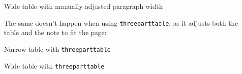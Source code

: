 \documentclass[11pt,a4paper]{article}
\begin{document}
\begin{table}[H]
	\caption{Wide table with manually adjusted paragraph width}
	\label{tbl_widenote}
	\begin{adjustbox}{max width = \textwidth}
		
	\end{adjustbox}
\end{table}
 
The same doesn't happen when using \texttt{threeparttable}, as it adjusts both the table and the note to fit the page:
 
\begin{table}[h]
	\centering
	\caption{Narrow table with \texttt{threeparttable}}
	\label{tbl_fittednotenarrow}
	\begin{adjustbox}{max width = \textwidth}
	\begin{threeparttable}
		
	\end{threeparttable}
	\end{adjustbox}
\end{table}
 
\begin{table}[h]
	\caption{Wide table with \texttt{threeparttable}}
	\label{tbl_fittednotewide}
	\begin{adjustbox}{max width = \textwidth}
	\begin{threeparttable}
		
	\end{threeparttable}
	\end{adjustbox}
\end{table}
 
\end{document}

